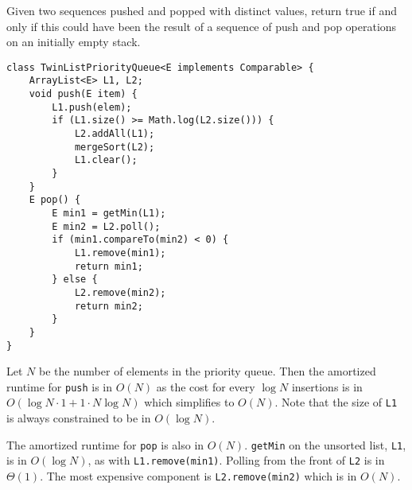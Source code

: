 \begin{blocksection}
\question Given two sequences pushed and popped with distinct values, return true if and only if this could have been the result of a sequence of push and pop operations on an initially empty stack. 



\begin{lstlisting}
class TwinListPriorityQueue<E implements Comparable> {
    ArrayList<E> L1, L2;
    void push(E item) {
        L1.push(elem);
        if (L1.size() >= Math.log(L2.size())) {
            L2.addAll(L1);
            mergeSort(L2);
            L1.clear();
        }
    }
    E pop() {
        E min1 = getMin(L1);
        E min2 = L2.poll();
        if (min1.compareTo(min2) < 0) {
            L1.remove(min1);
            return min1;
        } else {
            L2.remove(min2);
            return min2;
        }
    }
}
\end{lstlisting}

\begin{solution}
Let $N$ be the number of elements in the priority queue. Then the amortized
runtime for \lstinline$push$ is in $O(N)$ as the cost for every $\log N$
insertions is in $O(\log N \cdot 1 + 1 \cdot N \log N)$ which simplifies to
$O(N)$. Note that the size of \lstinline$L1$ is always constrained to be in
$O(\log N)$.

The amortized runtime for \lstinline$pop$ is also in $O(N)$. \lstinline$getMin$
on the unsorted list, \lstinline$L1$, is in $O(\log N)$, as with
\lstinline$L1.remove(min1)$. Polling from the front of \lstinline$L2$ is in
$\Theta(1)$. The most expensive component is \lstinline$L2.remove(min2)$ which
is in $O(N)$.
\end{solution}
\end{blocksection}

